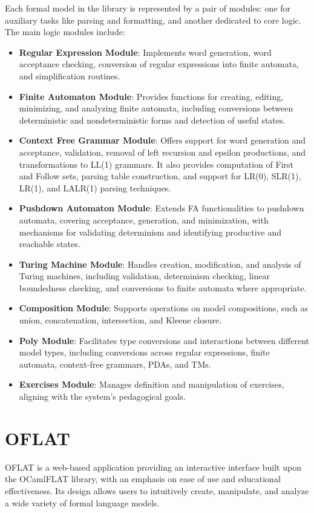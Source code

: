 Each formal model in the library is represented by a pair of modules: one for auxiliary tasks like parsing and formatting, and another dedicated to core logic. The main logic modules include:
\begin{itemize}
\item \textbf{Regular Expression Module}: Implements word generation, word acceptance checking, conversion of regular expressions into finite automata, and simplification routines.
\item \textbf{Finite Automaton Module}: Provides functions for creating, editing, minimizing, and analyzing finite automata, including conversions between deterministic and nondeterministic forms and detection of useful states.
\item \textbf{Context Free Grammar Module}: Offers support for word generation and acceptance, validation, removal of left recursion and epsilon productions, and transformations to LL(1) grammars. It also provides computation of First and Follow sets, parsing table construction, and support for LR(0), SLR(1), LR(1), and LALR(1) parsing techniques.
\item \textbf{Pushdown Automaton Module}: Extends FA functionalities to pushdown automata, covering acceptance, generation, and minimization, with mechanisms for validating determinism and identifying productive and reachable states.
\item \textbf{Turing Machine Module}: Handles creation, modification, and analysis of Turing machines, including validation, determinism checking, linear boundedness checking, and conversions to finite automata where appropriate.
\item \textbf{Composition Module}: Supports operations on model compositions, such as union, concatenation, intersection, and Kleene closure.
\item \textbf{Poly Module}: Facilitates type conversions and interactions between different model types, including conversions across regular expressions, finite automata, context-free grammars, PDAs, and TMs.
\item \textbf{Exercises Module}: Manages definition and manipulation of exercises, aligning with the system's pedagogical goals.
\end{itemize}

\section{OFLAT}

OFLAT is a web-based application providing an interactive interface built upon the OCamlFLAT library, 
with an emphasis on ease of use and educational effectiveness. Its design allows users to intuitively create, manipulate, and analyze a wide variety of formal language models.

